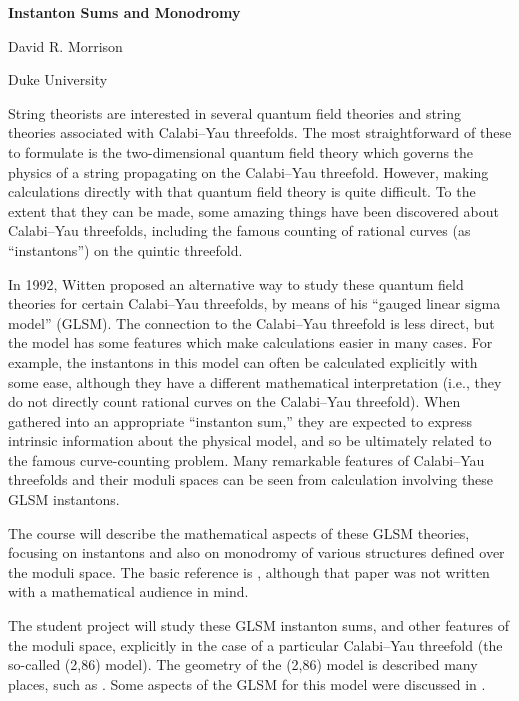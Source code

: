 \documentclass[12pt]{article}
\begin{document}
\centerline{\bf Instanton Sums and Monodromy}

\bigskip

\centerline{David R. Morrison}
\centerline{Duke University}

\bigskip

\bigskip

String theorists are interested in several quantum field theories and
string theories associated with Calabi--Yau threefolds.  The most 
straightforward of these to formulate is the two-dimensional quantum
field theory which governs the physics of a string propagating on
the Calabi--Yau threefold.  However, making calculations directly with
that quantum field theory is quite difficult.  To the extent that
they can be made, some amazing things have been discovered about 
Calabi--Yau threefolds, including the famous counting of rational
curves (as ``instantons'') on the quintic threefold.

In 1992, Witten proposed an alternative way to study these quantum
field theories for certain Calabi--Yau threefolds, by means of his
``gauged linear sigma model'' (GLSM).  The connection to the Calabi--Yau 
threefold 
is less direct, but the model has some features which make calculations
easier in many cases.  For example, the instantons in this model can
often be calculated explicitly with some ease, although they have
a different mathematical interpretation (i.e., they do not directly
count rational curves on the Calabi--Yau threefold).  When gathered 
into an appropriate ``instanton sum,'' they are expected to express
intrinsic information about the physical model, and so be ultimately
related to the famous curve-counting problem.  Many remarkable features 
of Calabi--Yau threefolds and their moduli spaces can be seen from
calculation involving these GLSM instantons.

The course will describe the mathematical aspects of these GLSM theories,
focusing on instantons and also on monodromy of various structures
defined over the moduli space.  The basic reference is \cite{summing},
although that paper was not written with a mathematical audience in mind.

The student project will study these 
 GLSM instanton sums, and other features 
of the moduli
space, explicitly in the case of a particular Calabi--Yau
threefold (the so-called (2,86) model).
The geometry of the (2,86) model is described many places, such
as \cite{bhole}.
Some aspects of the GLSM for this model were discussed in \cite{confinement}.
\end{document}
